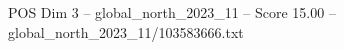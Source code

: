 \begin{textsample}{POS Dim 3 – global\_north\_2023\_11 – Score 15.00 – global\_north\_2023\_11/103583666.txt}
\end{textsample}
